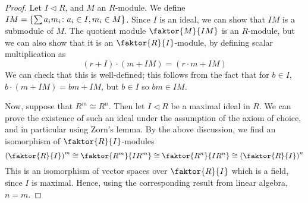 \begin{proof}
	Let \( I \triangleleft R \), and \( M \) an \( R \)-module.
	We define \( IM = \qty{\sum a_i m_i \colon a_i \in I, m_i \in M} \).
	Since \( I \) is an ideal, we can show that \( IM \) is a submodule of \( M \).
	The quotient module \( \faktor{M}{IM} \) is an \( R \)-module, but we can also show that it is an \( \faktor{R}{I} \)-module, by defining scalar multiplication as
	\[
		(r+I) \cdot (m+IM) = (r \cdot m + IM)
	\]
	We can check that this is well-defined; this follows from the fact that for \( b \in I \), \( b \cdot (m + IM) = bm + IM \), but \( b \in I \) so \( bm \in IM \).

	Now, suppose that \( R^m \cong R^n \).
	Then let \( I \triangleleft R \) be a maximal ideal in \( R \).
	We can prove the existence of such an ideal under the assumption of the axiom of choice, and in particular using Zorn's lemma.
	By the above discussion, we find an isomorphism of \( \faktor{R}{I} \)-modules
	\[
		\qty(\faktor{R}{I})^m \cong \faktor{R^m}{IR^m} \cong \faktor{R^n}{IR^n} \cong \qty(\faktor{R}{I})^n
	\]
	This is an isomorphism of vector spaces over \( \faktor{R}{I} \) which is a field, since \( I \) is maximal.
	Hence, using the corresponding result from linear algebra, \( n = m \).
\end{proof}

